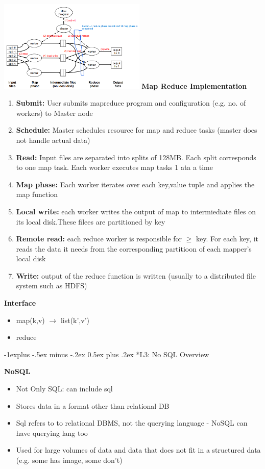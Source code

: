 \documentclass[10pt, landscape]{article}
\makeatletter
\renewcommand{\subsection}{\@startsection{subsection}{2}{0mm}%
                                {-1explus -.5ex minus -.2ex}%
                                {0.5ex plus .2ex}%
                                {\normalfont\normalsize\bfseries}}
\makeatother
\begin{document}
\begin{multicols}{4}
\includegraphics*[width=7cm]{map_reduce_impl}
\textbf{Map Reduce Implementation}
\begin{enumerate}
  \item \textbf{Submit:} User submits mapreduce program and configuration (e.g. no. of workers) to Master node
  \item \textbf{Schedule:} Master schedules resource for map and reduce tasks (master does not handle actual data)
  \item \textbf{Read:} Input files are separated into splits of 128MB. Each split corresponds to one map task. Each worker executes map tasks 1 ata a time 
  \item \textbf{Map phase:} Each worker iterates over each key,value tuple and applies the map function 
  \item \textbf{Local write: } each worker writes the output of map to intermiediate files on its local disk.These filees are partitioned by key 
  \item \textbf{Remote read:} each reduce worker is responsible for $\geq$ key. For each key, it reads the data it needs from the corresponding partitioon of each mapper's local disk
  \item \textbf{Write: } output of the reduce function is written (usually to a distributed file system such as HDFS)
\end{enumerate}
  

\textbf{Interface}
\begin{itemize}
  \item map(k,v) $\rightarrow$ list(k',v')
  \item reduce 
\end{itemize}




\subsection*{L3: No SQL Overview}

\textbf{NoSQL}
\begin{itemize}
  \item Not Only SQL: can include sql
  \item Stores data in a format other than relational DB 
  \item Sql refers to to relational DBMS, not the querying language - NoSQL can have querying lang too 
  \item Used for large volumes of data and data that does not fit in a structured data (e.g. some has image, some don't)
\end{itemize}


\end{multicols}
\end{document}
